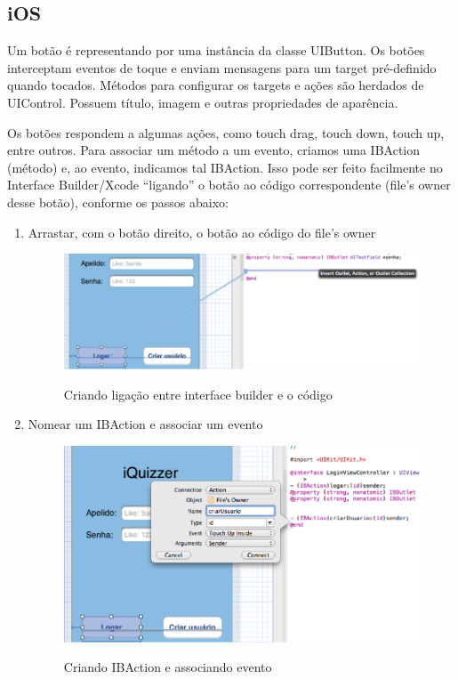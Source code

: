     \subsection{iOS}
           
    Um botão é representando por uma instância da classe UIButton. Os botões interceptam eventos de toque e enviam mensagens para um target pré-definido quando tocados. Métodos para configurar os targets e ações são herdados de UIControl. Possuem título, imagem e outras propriedades de aparência.
     
     
    Os botões respondem a algumas ações, como touch drag, touch down, touch up, entre outros. Para associar um método a um evento, criamos uma IBAction (método) e, ao evento, indicamos tal IBAction. Isso pode ser feito facilmente no Interface Builder/Xcode ``ligando'' o botão ao código correspondente (file's owner desse botão), conforme os passos abaixo:
\begin{enumerate}     
\item Arrastar, com o botão direito, o botão ao código do file's owner
		 \begin{figure}[H]
		   \centering
		   \includegraphics{figs/iosbtn1.png}\\
		   \caption{ Criando ligação entre interface builder e o código }
		   \label{FIG:iosbtn1}
		 \end{figure}
         
 \item Nomear um IBAction e associar um evento
 \begin{figure}[H]
   \centering
   \includegraphics{figs/iosbtn2.png}\\
   \caption{ Criando IBAction e associando evento }
   \label{FIG:iosbtn2}
 \end{figure}
 
 \end{enumerate}    
     
